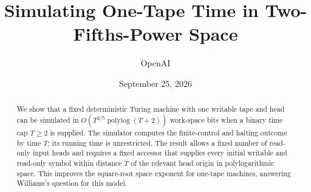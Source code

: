 \documentclass[11pt]{article}
\title{Simulating One-Tape Time in Two-Fifths-Power Space}
\author{OpenAI}
\date{September 25, 2026}
\theoremstyle{definition}
\theoremstyle{remark}
\newcommand{\polylog}{\operatorname{polylog}}
\begin{document}
\maketitle
\begin{abstract}
We show that a fixed deterministic Turing machine with one writable tape and
head can be simulated in \(O(T^{2/5}\polylog(T+2))\) work-space bits when a
binary time cap \(T\ge2\) is supplied. The simulator computes the finite-control
and halting outcome by time \(T\); its running time is unrestricted. The result
allows a fixed number of read-only input heads and requires a fixed accessor
that supplies every initial writable and read-only symbol within distance
\(T\) of the relevant head origin in polylogarithmic space. This improves the square-root
space exponent for one-tape machines, answering Williams's question for this model.
\end{abstract}







\end{document}
